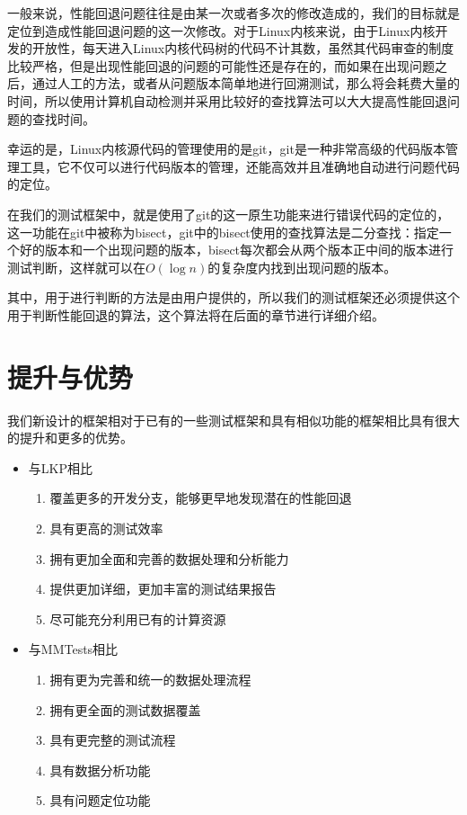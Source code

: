 一般来说，性能回退问题往往是由某一次或者多次的修改造成的，我们的目标就是定位到造成性能回退问题的这一次修改。对于Linux内核来说，由于Linux内核开发的开放性，每天进入Linux内核代码树的代码不计其数，虽然其代码审查的制度比较严格，但是出现性能回退的问题的可能性还是存在的，而如果在出现问题之后，通过人工的方法，或者从问题版本简单地进行回溯测试，那么将会耗费大量的时间，所以使用计算机自动检测并采用比较好的查找算法可以大大提高性能回退问题的查找时间。

幸运的是，Linux内核源代码的管理使用的是git，git是一种非常高级的代码版本管理工具，它不仅可以进行代码版本的管理，还能高效并且准确地自动进行问题代码的定位。

在我们的测试框架中，就是使用了git的这一原生功能来进行错误代码的定位的，这一功能在git中被称为bisect，git中的bisect使用的查找算法是二分查找：指定一个好的版本和一个出现问题的版本，bisect每次都会从两个版本正中间的版本进行测试判断，这样就可以在$O(\log{n})$的复杂度内找到出现问题的版本。

其中，用于进行判断的方法是由用户提供的，所以我们的测试框架还必须提供这个用于判断性能回退的算法，这个算法将在后面的章节进行详细介绍。


\section{提升与优势}

我们新设计的框架相对于已有的一些测试框架和具有相似功能的框架相比具有很大的提升和更多的优势。

\begin{itemize}
\item 与LKP相比

\begin{enumerate}
\item 覆盖更多的开发分支，能够更早地发现潜在的性能回退
\item 具有更高的测试效率
\item 拥有更加全面和完善的数据处理和分析能力
\item 提供更加详细，更加丰富的测试结果报告
\item 尽可能充分利用已有的计算资源
\end{enumerate}

\item 与MMTests相比

\begin{enumerate}
\item 拥有更为完善和统一的数据处理流程
\item 拥有更全面的测试数据覆盖
\item 具有更完整的测试流程
\item 具有数据分析功能
\item 具有问题定位功能
\end{enumerate}

\end{itemize}